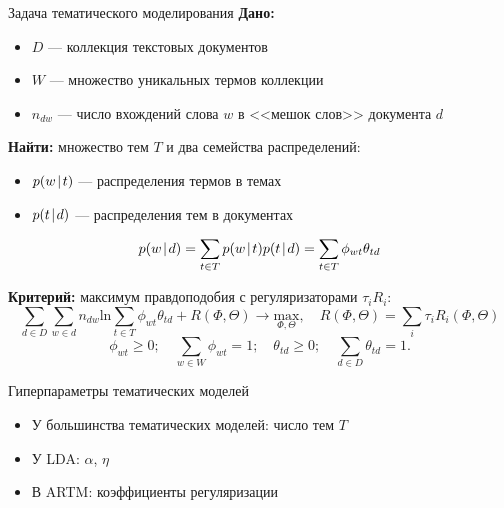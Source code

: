 \begin{frame}[t]{Задача тематического моделирования}
\textbf{Дано:}
\begin{itemize}
    \item $D$ --- коллекция текстовых документов
    \item $W$ --- множество уникальных термов коллекции
    \item $n_{dw}$ --- число вхождений слова $w$ в <<мешок слов>> документа $d$
\end{itemize}

\medskip
\textbf{Найти:}
множество тем $T$ и два семейства распределений:
\smallskip
\begin{itemize}
    \item $p(w \mspace{2mu}{|}\mspace{2mu} t)$ --- распределения термов в темах
    \item $p(t \mspace{2mu}{|}\mspace{2mu} d)$ --- распределения тем в документах
\end{itemize}

\[
p(w \mspace{2mu}{|}\mspace{2mu} d) = \sum_{t \in T} p(w \mspace{2mu}{|}\mspace{2mu} t)p(t \mspace{2mu}{|}\mspace{2mu} d) = \sum_{t \in T} \phi_{wt}\theta_{td}
\]

\smallskip
\textbf{Критерий:} максимум правдоподобия с регуляризаторами $\tau_i R_i$:
\[
    \sum_{d \in D} \sum_{w \in d} n_{dw} \mathrm{ln} \sum_{t \in T} \phi_{wt} \theta_{td} + R(\Phi, \Theta) \rightarrow \underset{\Phi, \Theta}{\mathrm{max}}, \quad R(\Phi, \Theta) = \sum_{i} \tau_i R_i(\Phi, \Theta)
\]
\[
\phi_{wt} \ge 0; \quad \sum_{w \in W} \phi_{wt} = 1; \quad \theta_{td} \ge 0; \quad \sum_{d \in D} \theta_{td} = 1.
\]
\bigskip

\end{frame}

\begin{frame}{Гиперпараметры тематических моделей}
\begin{itemize}
    \item У большинства тематических моделей: число тем $T$
    \item У LDA: $\alpha$, $\eta$
    \item В ARTM: коэффициенты регуляризации
\end{itemize}
\end{frame}

